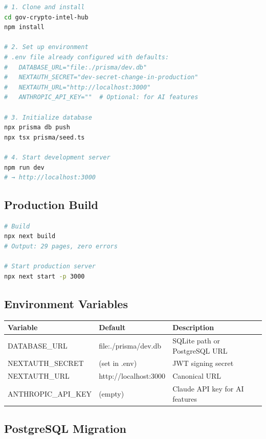 \documentclass[12pt,a4paper]{article}
\begin{document}
\begin{lstlisting}[language=bash,caption={Setup Commands}]
# 1. Clone and install
cd gov-crypto-intel-hub
npm install

# 2. Set up environment
# .env file already configured with defaults:
#   DATABASE_URL="file:./prisma/dev.db"
#   NEXTAUTH_SECRET="dev-secret-change-in-production"
#   NEXTAUTH_URL="http://localhost:3000"
#   ANTHROPIC_API_KEY=""  # Optional: for AI features

# 3. Initialize database
npx prisma db push
npx tsx prisma/seed.ts

# 4. Start development server
npm run dev
# → http://localhost:3000
\end{lstlisting}

\subsection{Production Build}

\begin{lstlisting}[language=bash,caption={Production Commands}]
# Build
npx next build
# Output: 29 pages, zero errors

# Start production server
npx next start -p 3000
\end{lstlisting}

\subsection{Environment Variables}

\begin{center}
\begin{tabular}{llp{5cm}}
\toprule
\textbf{Variable} & \textbf{Default} & \textbf{Description} \\
\midrule
DATABASE\_URL & file:./prisma/dev.db & SQLite path or PostgreSQL URL \\
NEXTAUTH\_SECRET & (set in .env) & JWT signing secret \\
NEXTAUTH\_URL & http://localhost:3000 & Canonical URL \\
ANTHROPIC\_API\_KEY & (empty) & Claude API key for AI features \\
\bottomrule
\end{tabular}
\end{center}

\subsection{PostgreSQL Migration}
\end{document}
